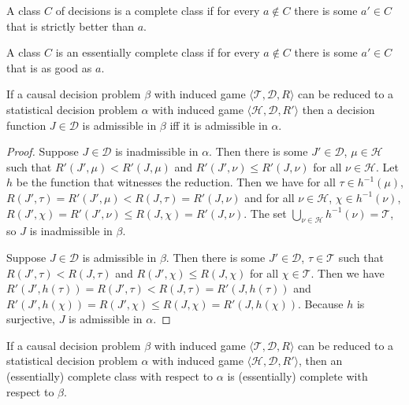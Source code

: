 \begin{definition}
A class $C$ of decisions is a complete class if for every $a\not\in C$ there is some $a'\in C$ that is strictly better than $a$.

A class $C$ is an essentially complete class if for every $a\not\in C$ there is some $a'\in C$ that is as good as $a$.
\end{definition}

\begin{lemma}\label{lem:red_adm}
If a causal decision problem $\beta$ with induced game $\langle \mathscr{T},\mathscr{D}, R\rangle$ can be reduced to a statistical decision problem $\alpha$ with induced game $\langle \mathscr{H},\mathscr{D},R' \rangle$ then a decision function $J\in \mathscr{D}$ is admissible in $\beta$ iff it is admissible in $\alpha$.
\end{lemma}


\begin{proof}
Suppose $J\in\mathscr{D}$ is inadmissible in $\alpha$. Then there is some $J'\in\mathscr{D}$, $\mu\in\mathscr{H}$ such that $R'(J',\mu)<R'(J,\mu)$ and $R'(J',\nu)\leq R'(J,\nu)$ for all $\nu\in \mathscr{H}$. Let $h$ be the function that witnesses the reduction. Then we have for all $\tau\in h^{-1}(\mu)$, $R(J',\tau)=R'(J',\mu)<R(J,\tau)=R'(J,\nu)$ and for all $\nu\in \mathscr{H}$, $\chi\in h^{-1}(\nu)$, $R(J',\chi)=R'(J',\nu)\leq R(J,\chi)=R'(J,\nu)$. The set $\bigcup_{\nu\in\mathscr{H}} h^{-1}(\nu)=\mathscr{T}$, so $J$ is inadmissible in $\beta$.

Suppose $J\in \mathscr{D}$ is admissible in $\beta$. Then there is some $J'\in\mathscr{D}$, $\tau\in\mathscr{T}$ such that $R(J',\tau)<R(J,\tau)$ and $R(J',\chi)\leq R(J,\chi)$ for all $\chi\in \mathscr{T}$. Then we have $R'(J',h(\tau))=R(J',\tau)<R(J,\tau)=R'(J,h(\tau))$ and $R'(J',h(\chi))=R(J',\chi)\leq R(J,\chi)=R'(J,h(\chi))$. Because $h$ is surjective, $J$ is admissible in $\alpha$.
\end{proof}

\begin{corollary}\label{cor:red_comp}
If a causal decision problem $\beta$ with induced game $\langle \mathscr{T},\mathscr{D}, R\rangle$ can be reduced to a statistical decision problem $\alpha$ with induced game $\langle \mathscr{H},\mathscr{D},R' \rangle$, then an (essentially) complete class with respect to $\alpha$ is (essentially) complete with respect to $\beta$.
\end{corollary}

